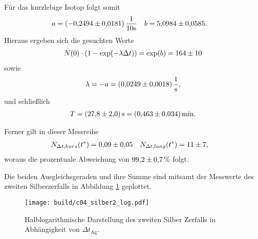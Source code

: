 \noindent
Für das kurzlebige Isotop folgt somit 
\begin{align}
    a &= (\num{-0.2494 +- 0.0181}) \, \frac{1}{10 \unit{\second}}  & b &= \num{5.0984 +-0.0585}.
\end{align}
Hieraus ergeben sich die gesuchten Werte
\begin{align}
    N(0) \cdot \left(1- \exp(- \lambda \Delta t)\right) = \exp(b) = \num[]{164 +- 10}
\end{align}
sowie 
\begin{align}
    \lambda = - a = \qty[]{0.0249 +- 0.0018}{\per\second},
\end{align}
und schließlich
\begin{align}
    T = \qty[]{27.8 +- 2.0}{\second} = \qty[]{0.463 +- 0.034}{\minute}.
\end{align}

\noindent
Ferner gilt in dieser Messreihe
\begin{align*}
    N_{\Delta t,kurz}(t^*) &= \num[]{0.09 +- 0.05} & N_{\Delta t,lang}(t^*) &= \num[]{11 +- 7}, 
\end{align*}
woraus die prozentuale Abweichung von $\num[]{99.2 +- 0.7} \, \%$ folgt.

\noindent
Die beiden Ausgleichsgeraden und ihre Summe sind mitsamt der Messwerte des zweiten Silberzerfalls in Abbildung \ref{fig:silber2_log} geplottet.

\begin{figure}[H]
    \centering
    \texttt{[image: build/c04\_silber2\_log.pdf]}
    \caption[]{Halblogarithmische Darstellung des zweiten Silber Zerfalls in Abhängigkeit von $\Delta t_\text{Ag}$.}
    \label{fig:silber2_log}
\end{figure}